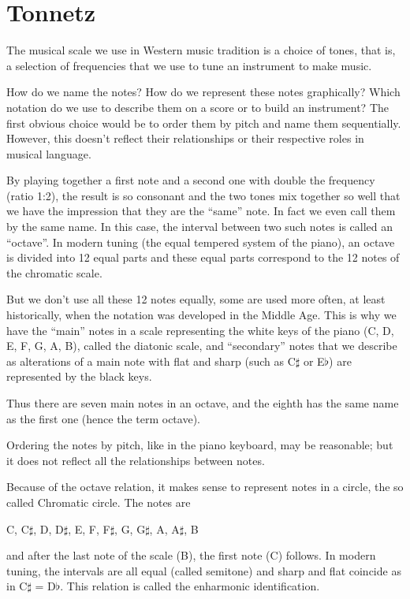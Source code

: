 \section{Tonnetz}

The musical scale we use in Western music tradition is a choice of tones, that is, a selection of frequencies that we use to tune an instrument to make music.

How do we name the notes? How do we represent these notes graphically? Which notation do we use to describe them on a score or to build an instrument? The first obvious choice would be to order them by pitch and name them sequentially. However, this doesn't reflect their relationships or their respective roles in musical language.

By playing together a first note and a second one with double the frequency (ratio 1:2), the result is so consonant and the two tones mix together so well that we have the impression that they are the ``same'' note. In fact we even call them by the same name. In this case, the interval between two such notes is called an ``octave''. In modern tuning (the equal tempered system of the piano), an octave is divided into 12 equal parts and these equal parts correspond to the 12 notes of the chromatic scale.

But we don't use all these 12 notes equally, some are used more often, at least historically, when the notation was developed in the Middle Age. This is why we have the ``main'' notes in a scale representing the white keys of the piano (C, D, E, F, G, A, B), called the diatonic scale, and ``secondary'' notes that we describe as alterations of a main note with flat and sharp (such as C$\sharp$ or E$\flat$) are represented by the black keys.

Thus there are seven main notes in an octave, and the eighth has the same name as the first one (hence the term octave).

Ordering the notes by pitch, like in the piano keyboard, may be reasonable; but it does not reflect all the relationships between notes.

Because of the octave relation, it makes sense to represent notes in a circle, the so called Chromatic circle. The notes are

\begin{center}
C, C$\sharp$, D, D$\sharp$, E, F, F$\sharp$, G, G$\sharp$, A, A$\sharp$, B
\end{center}

and after the last note of the scale (B), the first note (C) follows. In modern tuning, the intervals are all equal (called semitone) and sharp and flat coincide as in C$\sharp$ = D$\flat$. This relation is called the enharmonic identification.

